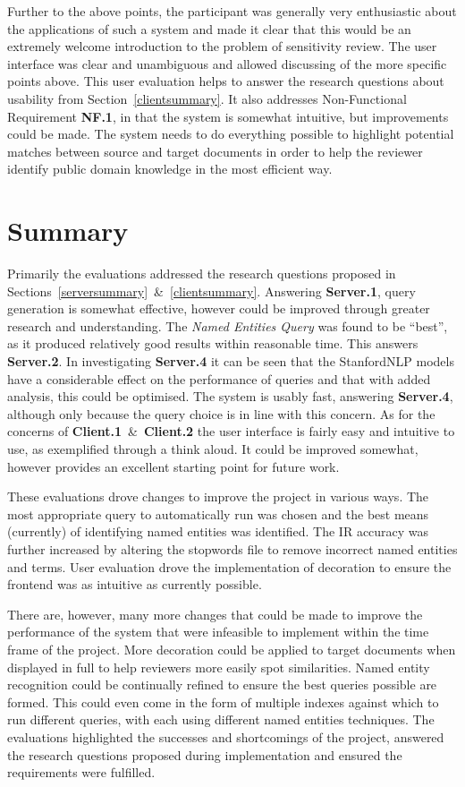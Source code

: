 \documentclass{l4proj}
\begin{document}
Further to the above points, the participant was generally very enthusiastic about the applications of such a system and made it clear that this would be an extremely welcome introduction to the problem of sensitivity review. The user interface was clear and unambiguous and allowed discussing of the more specific points above.
This user evaluation helps to answer the research questions about usability from Section~\ref{clientsummary}. It also addresses Non-Functional Requirement \textbf{NF.1}, in that the system is somewhat intuitive, but improvements could be made.
The system needs to do everything possible to highlight potential matches between source and target documents in order to help the reviewer identify public domain knowledge in the most efficient way.

\section{Summary}
Primarily the evaluations addressed the research questions proposed in Sections~\ref{serversummary}~\&~\ref{clientsummary}.
Answering \textbf{Server.1}, query generation is somewhat effective, however could be improved through greater research and understanding. The \textit{Named Entities Query} was found to be ``best'', as it produced relatively good results within reasonable time. This answers \textbf{Server.2}. In investigating \textbf{Server.4} it can be seen that the StanfordNLP models have a considerable effect on the performance of queries and that with added analysis, this could be optimised. The system is usably fast, answering \textbf{Server.4}, although only because the query choice is in line with this concern. As for the concerns of \textbf{Client.1}~\&~\textbf{Client.2} the user interface is fairly easy and intuitive to use, as exemplified through a think aloud. It could be improved somewhat, however provides an excellent starting point for future work.

These evaluations drove changes to improve the project in various ways. The most appropriate query to automatically run was chosen and the best means (currently) of identifying named entities was identified. The IR accuracy was further increased by altering the stopwords file to remove incorrect named entities and terms. User evaluation drove the implementation of decoration to ensure the frontend was as intuitive as currently possible.

There are, however, many more changes that could be made to improve the performance of the system that were infeasible to implement within the time frame of the project.
More decoration could be applied to target documents when displayed in full to help reviewers more easily spot similarities.
Named entity recognition could be continually refined to ensure the best queries possible are formed. This could even come in the form of multiple indexes against which to run different queries, with each using different named entities techniques.
The evaluations highlighted the successes and shortcomings of the project, answered the research questions proposed during implementation and ensured the requirements were fulfilled.
\end{document}

